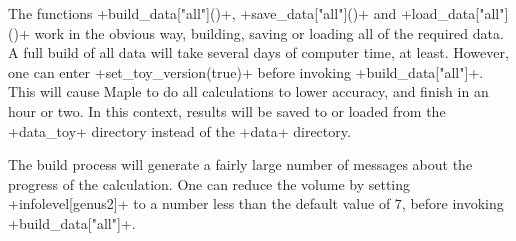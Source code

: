 \documentclass[reqno]{amsart}
\renewcommand{\:}{\colon}
\theoremstyle{definition}
\begin{document}
The functions \mcode+build_data["all"]()+, \mcode+save_data["all"]()+
and \mcode+load_data["all"]()+ work in the obvious way, building,
saving or loading all of the required data.  A full build of all data
will take several days of computer time, at least.  However, one can
enter \mcode+set_toy_version(true)+ before invoking
\mcode+build_data["all"]+.  This will cause Maple to do all
calculations to lower accuracy, and finish in an hour or two.  In this
context, results will be saved to or loaded from the
\fname+data_toy+ directory instead of the \fname+data+ directory.

The build process will generate a fairly large number of messages
about the progress of the calculation.  One can reduce the volume by
setting \mcode+infolevel[genus2]+ to a number less than the default
value of $7$, before invoking \mcode+build_data["all"]+.



\end{document}
